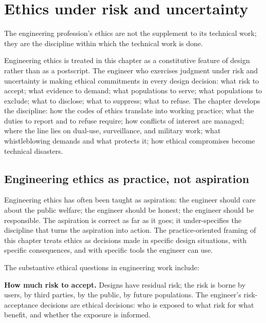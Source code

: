 \chapter{Ethics under risk and uncertainty}
\label{vol11:ch11}

\epigraph{The engineering profession's ethics are not the supplement to its technical work; they are the discipline within which the technical work is done.}{}


\noindent
Engineering ethics is treated in this chapter as a constitutive feature of design rather than as a postscript. The engineer who exercises judgment under risk and uncertainty is making ethical commitments in every design decision: what risk to accept; what evidence to demand; what populations to serve; what populations to exclude; what to disclose; what to suppress; what to refuse. The chapter develops the discipline: how the codes of ethics translate into working practice; what the duties to report and to refuse require; how conflicts of interest are managed; where the line lies on dual-use, surveillance, and military work; what whistleblowing demands and what protects it; how ethical compromises become technical disasters.

\section{Engineering ethics as practice, not aspiration}

Engineering ethics has often been taught as aspiration: the engineer should care about the public welfare; the engineer should be honest; the engineer should be responsible. The aspiration is correct as far as it goes; it under-specifies the discipline that turns the aspiration into action. The practice-oriented framing of this chapter treats ethics as decisions made in specific design situations, with specific consequences, and with specific tools the engineer can use.

The substantive ethical questions in engineering work include:

\textbf{How much risk to accept.} Designs have residual risk; the risk is borne by users, by third parties, by the public, by future populations. The engineer's risk-acceptance decisions are ethical decisions: who is exposed to what risk for what benefit, and whether the exposure is informed.


